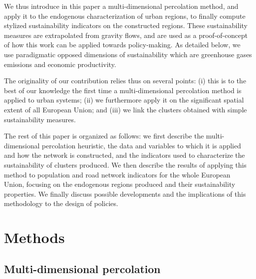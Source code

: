 \documentclass{jimis-en}
\begin{document}
We thus introduce in this paper a multi-dimensional percolation method, and apply it to the endogenous characterization of urban regions, to finally compute stylized sustainability indicators on the constructed regions. These sustainability measures are extrapolated from gravity flows, and are used as a proof-of-concept of how this work can be applied towards policy-making. As detailed below, we use paradigmatic opposed dimensions of sustainability which are greenhouse gases emissions and economic productivity.


The originality of our contribution relies thus on several points: (i) this is to the best of our knowledge the first time a multi-dimensional percolation method is applied to urban systems; (ii) we furthermore apply it on the significant spatial extent of all European Union; and (iii) we link the clusters obtained with simple sustainability measures.


The rest of this paper is organized as follows: we first describe the multi-dimensional percolation heuristic, the data and variables to which it is applied and how the network is constructed, and the indicators used to characterize the sustainability of clusters produced. We then describe the results of applying this method to population and road network indicators for the whole European Union, focusing on the endogenous regions produced and their sustainability properties. We finally discuss possible developments and the implications of this methodology to the design of policies.



\section{Methods}




\subsection{Multi-dimensional percolation}
\end{document}
